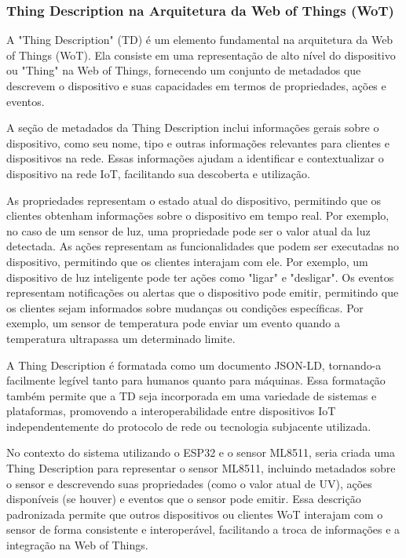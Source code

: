 \subsubsection{Thing Description na Arquitetura da Web of Things (WoT)}

A "Thing Description" (TD) é um elemento fundamental na arquitetura da Web of Things (WoT). Ela consiste em uma representação de alto nível do dispositivo ou "Thing" na Web of Things, fornecendo um conjunto de metadados que descrevem o dispositivo e suas capacidades em termos de propriedades, ações e eventos.

A seção de metadados da Thing Description inclui informações gerais sobre o dispositivo, como seu nome, tipo e outras informações relevantes para clientes e dispositivos na rede. Essas informações ajudam a identificar e contextualizar o dispositivo na rede IoT, facilitando sua descoberta e utilização.

As propriedades representam o estado atual do dispositivo, permitindo que os clientes obtenham informações sobre o dispositivo em tempo real. Por exemplo, no caso de um sensor de luz, uma propriedade pode ser o valor atual da luz detectada. As ações representam as funcionalidades que podem ser executadas no dispositivo, permitindo que os clientes interajam com ele. Por exemplo, um dispositivo de luz inteligente pode ter ações como "ligar" e "desligar". Os eventos representam notificações ou alertas que o dispositivo pode emitir, permitindo que os clientes sejam informados sobre mudanças ou condições específicas. Por exemplo, um sensor de temperatura pode enviar um evento quando a temperatura ultrapassa um determinado limite.

A Thing Description é formatada como um documento JSON-LD, tornando-a facilmente legível tanto para humanos quanto para máquinas. Essa formatação também permite que a TD seja incorporada em uma variedade de sistemas e plataformas, promovendo a interoperabilidade entre dispositivos IoT independentemente do protocolo de rede ou tecnologia subjacente utilizada.

No contexto do sistema utilizando o ESP32 e o sensor ML8511, seria criada uma Thing Description para representar o sensor ML8511, incluindo metadados sobre o sensor e descrevendo suas propriedades (como o valor atual de UV), ações disponíveis (se houver) e eventos que o sensor pode emitir. Essa descrição padronizada permite que outros dispositivos ou clientes WoT interajam com o sensor de forma consistente e interoperável, facilitando a troca de informações e a integração na Web of Things.

